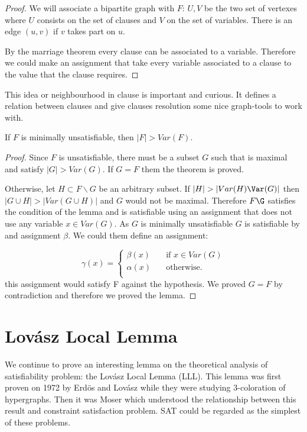 \begin{proof}
  We will associate a bipartite graph with $F$:  $U, V$ be the two set of vertexes where $U$ consists on the set of clauses and $V$ on the set of variables. There is an edge $(u,v)$ if $v$ takes part on $u$.

  By the marriage theorem every clause can be associated to a variable. Therefore we could make an assignment that take every variable associated to a clause to the value that the clause requires.
\end{proof}

This idea or neighbourhood in clause is important and curious. It defines a relation between clauses and give clauses resolution some nice graph-tools to work with.

\begin{proposition}
	If $F$ is minimally unsatisfiable, then $|F| > Var(F)$.
\end{proposition}

\begin{proof}
  Since $F$ is unsatisfiable, there must be a subset $G$ such that is maximal and satisfy $|G| > Var(G)$. If $G=F$ them the theorem is proved.


  Otherwise, let $H \subset F\backslash G$ be an arbitrary subset. If $|H| > |Var(H)\Var(G)|$ then $|G \cup H| > |Var(G\cup H)|$ and $G$ would not be maximal.  Therefore $F\G$ satisfies the condition of the lemma and is satisfiable using an assignment that does not use any variable $x \in Var(G)$. As $G$ is minimally unsatisfiable $G$ is satisfiable by and assignment $\beta$. We could them define an assignment:

  \[   
\gamma(x) = 
     \begin{cases}
       \beta(x) &\quad\text{if } x \in Var(G)\\
       \alpha(x) &\quad\text{otherwise.} \\ 
     \end{cases}
   \]
this assignment would satisfy F against the hypothesis. We proved $G=F$ by contradiction and therefore we proved the lemma.
\end{proof}




\section{Lovász Local Lemma}
We continue to prove an interesting lemma on the theoretical analysis of satisfiability problem: the Lovász Local Lemma (LLL). This lemma was first proven on 1972 by Erdös and Lovász while they were studying 3-coloration of hypergraphs. Then it was Moser which understood the relationship between  this result and constraint satisfaction problem. SAT could be regarded as the simplest of these problems. \\

